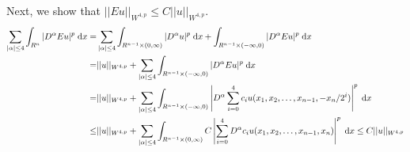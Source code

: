 Next, we show that $||E u||_{W^{4, p}} \leq C ||u||_{W^{4, p}}$.
\begin{align*}
  \sum_{|\alpha| \leq 4} \int_{R^n} |D^\alpha E u|^p \;\mathrm{d}x
    = &\sum_{|\alpha| \leq 4} \int_{R^{n - 1} \times (0, \infty)} |D^\alpha u|^p \;\mathrm{d}x
      + \int_{R^{n - 1} \times (-\infty, 0)} |D^\alpha E u|^p \;\mathrm{d}x\\
    = &||u||_{W^{4, p}} + \sum_{|\alpha| \leq 4} \int_{R^{n - 1} \times (-\infty, 0)} |D^\alpha E u|^p \;\mathrm{d}x\\
    = &||u||_{W^{4, p}} + \sum_{|\alpha| \leq 4} \int_{R^{n - 1} \times (-\infty, 0)}
                          \left| D^\alpha \sum_{i = 0}^4 c_i u(x_1, x_2, \ldots, x_{n - 1}, -x_n / 2^i) \right|^p \;\mathrm{d}x\\
 \leq &||u||_{W^{4, p}} + \sum_{|\alpha| \leq 4} \int_{R^{n - 1} \times (0, \infty)}
                          C \left| \sum_{i = 0}^4 D^\alpha c_i u(x_1, x_2, \ldots, x_{n - 1}, x_n) \right|^p \;\mathrm{d}x
 \leq C ||u||_{W^{4, p}}
\end{align*}
